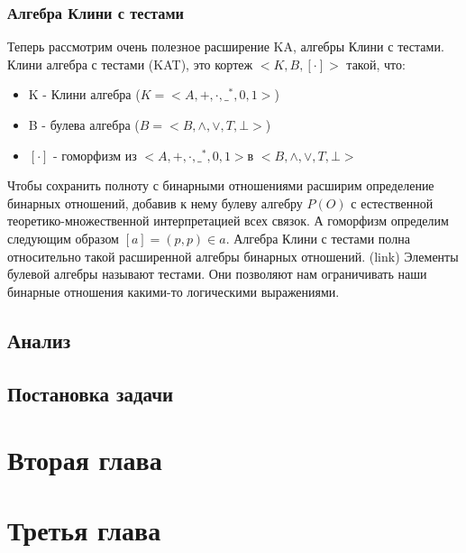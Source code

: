 \documentclass[times,specification,annotation]{itmo-student-thesis}
\begin{document}
    \subsection{Алгебра Клини с тестами}
      Теперь рассмотрим очень полезное расширение KA, алгебры Клини с тестами.
      Клини алгебра с тестами (KAT), это кортеж $ <K, B, [\cdot]> $ такой, что:

      \begin{itemize}
        \item K - Клини алгебра ($ K=<A, +, \cdot, \_^*, 0, 1> $)
        \item B - булева алгебра ($ B=<B, \wedge, \vee, T, \bot> $)
        \item $ [\cdot] $ - гоморфизм из $ <A, +, \cdot, \_^*, 0, 1>  $в $ <B, \wedge, \vee, T, \bot> $
      \end{itemize}

      Чтобы сохранить полноту с бинарными отношениями расширим определение бинарных отношений, добавив к нему булеву алгебру $P(O) $ с естественной теоретико-множественной интерпретацией всех связок. А гоморфизм определим следующим образом $ [a] = {(p, p) \in a} $.
      Алгебра Клини с тестами полна относительно такой расширенной алгебры бинарных отношений. (link)
      Элементы булевой алгебры называют тестами. Они позволяют нам ограничивать наши бинарные отношения какими-то логическими выражениями.

  \section{Анализ}

  \section{Постановка задачи}

\chapter{Вторая глава}

\chapter{Третья глава}
\end{document}
